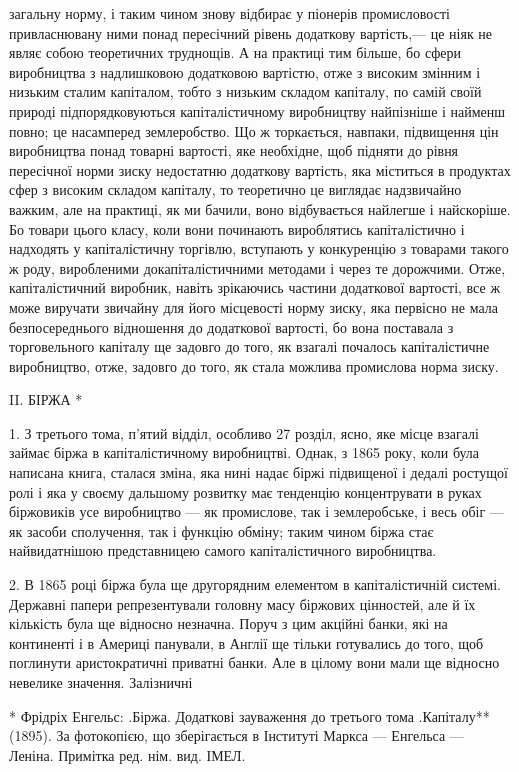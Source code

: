 \parcont{}  %
загальну норму, і таким чином знову відбирає у піонерів промисловості привласнювану ними понад пересічний рівень додаткову
вартість,— це ніяк не являє собою теоретичних труднощів. А на практиці тим більше, бо сфери виробництва з надлишковою
додатковою вартістю, отже з високим змінним і низьким сталим капіталом, тобто з низьким складом капіталу, по самій своїй
природі підпорядковуються капіталістичному виробництву найпізніше і найменш повно; це насамперед землеробство. Що ж
торкається, навпаки, підвищення цін виробництва понад товарні вартості, яке необхідне, щоб підняти до рівня пересічної норми
зиску недостатню додаткову вартість, яка міститься в продуктах сфер з високим складом капіталу, то теоретично це виглядає
надзвичайно важким, але на практиці, як ми бачили, воно відбувається найлегше і найскоріше. Бо товари цього класу, коли вони
починають вироблятись капіталістично і надходять у капіталістичну торгівлю, вступають у конкуренцію з товарами такого ж
роду, виробленими докапіталістичними методами і через те дорожчими. Отже, капіталістичний виробник, навіть зрікаючись
частини додаткової вартості, все ж може виручати звичайну для його місцевості норму зиску, яка первісно не мала
безпосереднього відношення до додаткової вартості, бо вона поставала з торговельного капіталу ще задовго до того, як взагалі
почалось капіталістичне виробництво, отже, задовго до того, як стала можлива промислова норма зиску.

II. БІРЖА *

1. З третього тома, п’ятий відділ, особливо 27 розділ, ясно, яке місце взагалі займає біржа в капіталістичному виробництві. Однак, з 1865 року, коли була написана книга, сталася зміна, яка нині надає біржі підвищеної і дедалі ростущої ролі і яка у
своєму дальшому розвитку має тенденцію концентрувати в руках біржовиків усе виробництво — як промислове, так і землеробське,
і весь обіг — як засоби сполучення, так і функцію обміну; таким чином біржа стає найвидатнішою представницею самого
капіталістичного виробництва.

2. В 1865 році біржа була ще другорядним елементом в капіталістичній системі. Державні папери
репрезентували головну масу біржових цінностей, але й їх кількість була ще відносно незначна. Поруч з цим акційні банки, які
на континенті і в Америці панували, в Англії ще тільки готувались до того, щоб поглинути аристократичні приватні банки. Але
в цілому вони мали ще відносно невелике значення. Залізничні

* Фрідріх Енгельс: .Біржа. Додаткові зауваження до третього тома .Капіталу** (1895). За фотокопією, що зберігається в
Інституті Маркса — Енгельса — Леніна. Примітка ред. нім. вид. ІМЕЛ.
\parbreak{}  %
